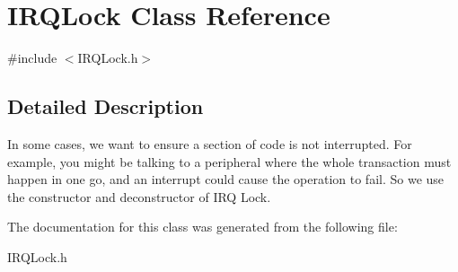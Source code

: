 \hypertarget{class_i_r_q_lock}{}\section{I\+R\+Q\+Lock Class Reference}
\label{class_i_r_q_lock}


{\ttfamily \#include $<$I\+R\+Q\+Lock.\+h$>$}



\subsection{Detailed Description}
In some cases, we want to ensure a section of code is not interrupted. For example, you might be talking to a peripheral where the whole transaction must happen in one go, and an interrupt could cause the operation to fail. So we use the constructor and deconstructor of I\+RQ Lock. 

The documentation for this class was generated from the following file\+:\begin{DoxyCompactItemize}
\item 
I\+R\+Q\+Lock.\+h\end{DoxyCompactItemize}
